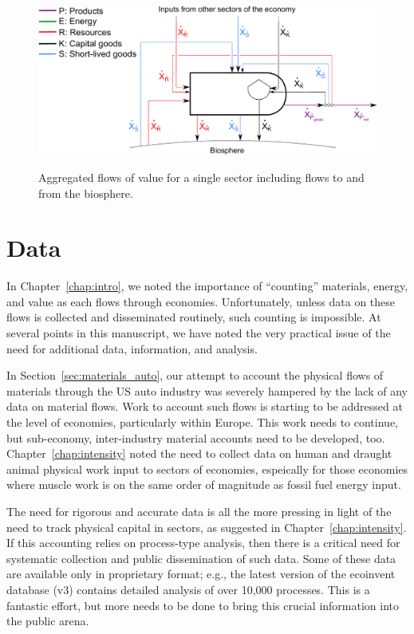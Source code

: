 \begin{figure}[ht!]
\centering\
\includegraphics[width=0.8\linewidth]{Part_3/Chapter_Unfinished/images/PERKS_basic_unit_value_with_biosphere_flows.pdf}
\caption[Aggregated flows of value for a single sector including flows to and from the biosphere]{Aggregated flows of value for a single sector including flows to and from the biosphere.}
\label{fig:basic_value_with_biosphere_flows}
\end{figure}


\section{Data}
\label{sec:Data}

In Chapter~\ref{chap:intro}, 
we noted the importance of ``counting''
materials, energy, and value as each flows through economies.  
Unfortunately, unless data on these flows 
is collected and disseminated routinely, 
such counting is impossible.
At several points in this manuscript,
we have noted the very practical issue of the
need for additional data, information, and analysis.

In Section~\ref{sec:materials_auto},
our attempt to account the physical flows of 
materials through the US auto industry was
severely hampered by the lack of any data on
material flows.
Work to account such flows is starting to be
addressed at the level of economies,
particularly within Europe.\cite{EUROSTAT2011}
This work needs to continue, but
sub-economy, inter-industry material accounts need to be developed, too.
Chapter~\ref{chap:intensity} noted the need to collect
data on human and draught animal physical work input to 
sectors of economies, espeically for those economies where 
muscle work is on the same order of magnitude 
as fossil fuel energy input.

The need for rigorous and accurate data
is all the more pressing in light of the need 
to track physical capital in sectors,
as suggested in Chapter~\ref{chap:intensity}.
If this accounting relies on process-type
analysis,
then there is a critical need for systematic
collection and public dissemination of such data.
Some of these data are available only in proprietary format;
e.g., the latest version of the ecoinvent database (v3)
contains detailed analysis of over 10,000 
processes.\cite{EcoInvent2012}
This is a fantastic effort, but more needs to be
done to bring this crucial information into the public arena.

